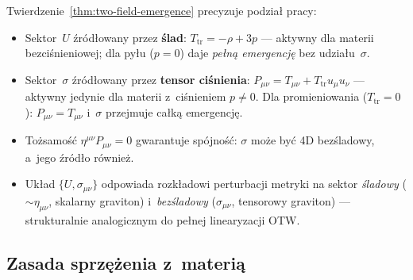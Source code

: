 \begin{remark}\label{rem:two-field-structure}
Twierdzenie~\ref{thm:two-field-emergence} precyzuje podzia\l{} pracy:
\begin{itemize}[nosep]
  \item Sektor~$U$ \'zr\'od\l{}owany przez \textbf{\'slad}:
    $T_{\mathrm{tr}} = -\rho + 3p$ --- aktywny dla materii
    bezci\'snieniowej; dla py\l{}u ($p=0$) daje \emph{pe\l{}n\k{a}
    emergencj\k{e}} bez udzia\l{}u~$\sigma$.
  \item Sektor~$\sigma$ \'zr\'od\l{}owany przez \textbf{tensor ci\'snienia}:
    $P_{\mu\nu} = T_{\mu\nu} + T_{\mathrm{tr}}u_\mu u_\nu$ ---
    aktywny jedynie dla materii z~ci\'snieniem $p\neq 0$.
    Dla promieniowania ($T_{\mathrm{tr}}=0$): $P_{\mu\nu}=T_{\mu\nu}$
    i~$\sigma$ przejmuje ca\l{}k\k{a} emergencj\k{e}.
  \item Tożsamość $\eta^{\mu\nu}P_{\mu\nu}=0$ gwarantuje
    sp\'ojno\'s\'c: $\sigma$ mo\.ze by\'c 4D bezśladowy,
    a~jego \'zr\'od\l{}o r\'ownie\.z.
  \item Uk\l{}ad $\{U, \sigma_{\mu\nu}\}$ odpowiada rozk\l{}adowi
    perturbacji metryki na sektor \emph{\'sladowy}
    ($\sim\eta_{\mu\nu}$, skalarny graviton) i~\emph{bezśladowy}
    ($\sigma_{\mu\nu}$, tensorowy graviton) --- strukturalnie
    analogicznym do pe\l{}nej linearyzacji OTW.
\end{itemize}
\end{remark}

\subsection{Zasada sprz\k{e}\.zenia z~materi\k{a}}\label{ssec:matter-coupling}

